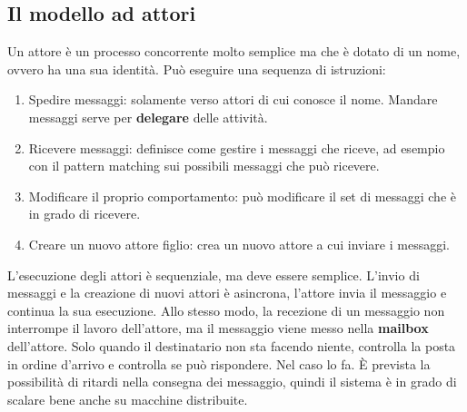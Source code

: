 \subsection{Il modello ad attori}

Un attore è un processo concorrente molto semplice ma che è dotato di un nome, ovvero ha una sua identità.
Può eseguire una sequenza di istruzioni:

\begin{enumerate}
	\item Spedire messaggi: solamente verso attori di cui conosce il nome. Mandare messaggi serve per \textbf{delegare} delle attività.
	\item Ricevere messaggi: definisce come gestire i messaggi che riceve, ad esempio con il pattern matching sui possibili messaggi che può ricevere.
	\item Modificare il proprio comportamento: può modificare il set di messaggi che è in grado di ricevere.
	\item Creare un nuovo attore figlio: crea un nuovo attore a cui inviare i messaggi.
\end{enumerate}

L'esecuzione degli attori è sequenziale, ma deve essere semplice.
L'invio di messaggi e la creazione di nuovi attori è asincrona, l'attore invia il messaggio e continua la sua esecuzione. Allo stesso modo, la recezione di un messaggio non interrompe il lavoro dell'attore, ma il messaggio viene messo nella \textbf{mailbox} dell'attore. Solo quando il destinatario non sta facendo niente, controlla la posta in ordine d'arrivo e controlla se può rispondere. Nel caso lo fa.
\`E prevista la possibilità di ritardi nella consegna dei messaggio, quindi il sistema è in grado di scalare bene anche su macchine distribuite.


